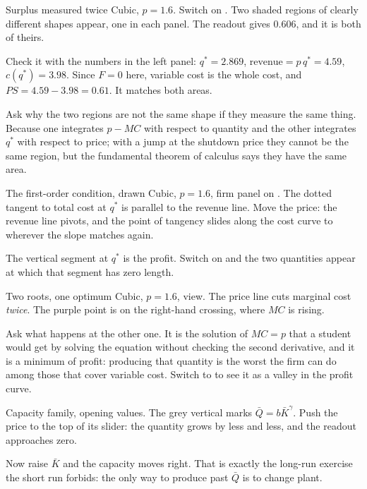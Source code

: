 \documentclass[11pt,a4paper]{appletmanual}
\begin{document}
\begin{activity}{Surplus measured twice}
\amset Cubic, $p = 1.6$. Switch on .
\amexp Two shaded regions of clearly different shapes appear, one in each
panel. The  readout gives $0.606$, and it is both of theirs.
\par\smallskip
Check it with the numbers in the left panel: $q^\ast = 2.869$,
$\text{revenue} = p\,q^\ast = 4.59$, $c(q^\ast) = 3.98$. Since $F = 0$ here,
variable cost is the whole cost, and $PS = 4.59 - 3.98 = 0.61$. It matches both
areas.
\par\smallskip
Ask why the two regions are not the same shape if they measure the same thing.
Because one integrates $p - MC$ with respect to quantity and the other
integrates $q^\ast$ with respect to price; with a jump at the shutdown price
they cannot be the same region, but the fundamental theorem of calculus says
they have the same area.
\end{activity}

\begin{activity}{The first-order condition, drawn}
\amset Cubic, $p = 1.6$, firm panel on .
\amexp The dotted tangent to total cost at $q^\ast$ is parallel to the revenue
line. Move the price: the revenue line pivots, and the point of tangency slides
along the cost curve to wherever the slope matches again.
\par\smallskip
The vertical segment at $q^\ast$ is the profit. Switch on 
and the two quantities appear at which that segment has zero length.
\end{activity}

\begin{activity}{Two roots, one optimum}
\amset Cubic, $p = 1.6$,  view.
\amexp The price line cuts marginal cost \emph{twice}. The purple point is on
the right-hand crossing, where $MC$ is rising.
\par\smallskip
Ask what happens at the other one. It is the solution of $MC = p$ that a
student would get by solving the equation without checking the second
derivative, and it is a minimum of profit: producing that quantity is the worst
the firm can do among those that cover variable cost. Switch to  to
see it as a valley in the profit curve.
\end{activity}

\begin{activity}{Capacity}
\amset {} family, opening values.
\amexp The grey vertical marks $\bar Q = b\bar K^{\gamma}$. Push the price to
the top of its slider: the quantity grows by less and less, and the
 readout approaches zero.
\par\smallskip
Now raise $\bar K$ and the capacity moves right. That is exactly the long-run
exercise the short run forbids: the only way to produce past $\bar Q$ is to
change plant.
\end{activity}
\end{document}
